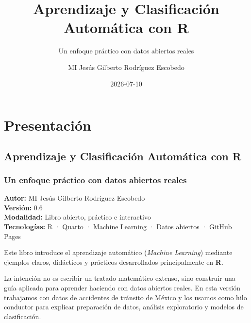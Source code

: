 \documentclass[
  spanish,
  11pt,
  letterpaper,
]{book}
\title{Aprendizaje y Clasificación Automática con R}
\subtitle{Un enfoque práctico con datos abiertos reales}
\author{MI Jesús Gilberto Rodríguez Escobedo}
\date{2026-07-10}
\renewcommand{\contentsname}{Índice general}
\renewcommand*\contentsname{Tabla de contenidos}
\newcommand\contentsname{Tabla de contenidos}
\begin{document}
\frontmatter
\maketitle

\renewcommand*\contentsname{Índice general}
{
\setcounter{tocdepth}{2}
\tableofcontents
}

\mainmatter
{}

\chapter*{Presentación}\label{presentaciuxf3n}


\section*{Aprendizaje y Clasificación Automática con
R}\label{aprendizaje-y-clasificaciuxf3n-automuxe1tica-con-r}


\subsection*{Un enfoque práctico con datos abiertos
reales}\label{un-enfoque-pruxe1ctico-con-datos-abiertos-reales}

\textbf{Autor:} MI Jesús Gilberto Rodríguez Escobedo\\
\textbf{Versión:} 0.6\\
\textbf{Modalidad:} Libro abierto, práctico e interactivo\\
\textbf{Tecnologías:} R · Quarto · Machine Learning · Datos abiertos ·
GitHub Pages

Este libro introduce el aprendizaje automático (\emph{Machine Learning})
mediante ejemplos claros, didácticos y prácticos desarrollados
principalmente en \textbf{R}.

La intención no es escribir un tratado matemático extenso, sino
construir una guía aplicada para aprender haciendo con datos abiertos
reales. En esta versión trabajamos con datos de accidentes de tránsito
de México y los usamos como hilo conductor para explicar preparación de
datos, análisis exploratorio y modelos de clasificación.
\end{document}
